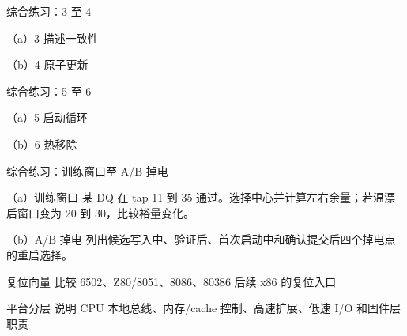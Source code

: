 \begin{chapterexercise}{综合练习：3 至 4}
\begin{exercisesubproblem}{（a）3}
描述一致性
\end{exercisesubproblem}
\begin{exercisesubproblem}{（b）4}
原子更新
\end{exercisesubproblem}
\end{chapterexercise}

\begin{chapterexercise}{综合练习：5 至 6}
\begin{exercisesubproblem}{（a）5}
启动循环
\end{exercisesubproblem}
\begin{exercisesubproblem}{（b）6}
热移除
\end{exercisesubproblem}
\end{chapterexercise}

\begin{chapterexercise}{综合练习：训练窗口至 A/B 掉电}
\begin{exercisesubproblem}{（a）训练窗口}
某 DQ 在 tap 11 到 35 通过。选择中心并计算左右余量；若温漂后窗口变为 20 到 30，比较裕量变化。
\end{exercisesubproblem}
\begin{exercisesubproblem}{（b）A/B 掉电}
列出候选写入中、验证后、首次启动中和确认提交后四个掉电点的重启选择。
\end{exercisesubproblem}
\end{chapterexercise}

\begin{chapterexercise}{复位向量}
比较 6502、Z80/8051、8086、80386 后续 x86 的复位入口
\end{chapterexercise}

\begin{chapterexercise}{平台分层}
说明 CPU 本地总线、内存/cache 控制、高速扩展、低速 I/O 和固件层职责
\end{chapterexercise}


